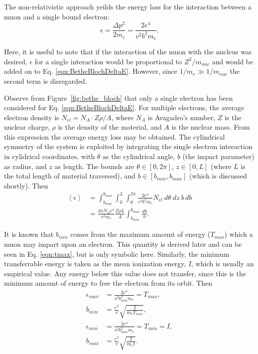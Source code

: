 The non-relativistic approach yeilds the energy loss for the interaction between a muon and a single bound electron:
\begin{equation}\label{eqn:BetheBlochDeltaE}
\epsilon=\frac{\Delta p^2}{2m_e}=\frac{2e^4}{v^2 b^2 m_e}.
\end{equation}

Here, it is useful to note that if the interaction of the muon with the nucleus was desired, $\epsilon$ for a single interaction would be proportional to $Z^2/m_{nuc}$ and would be added on to Eq. \eqref{eqn:BetheBlochDeltaE}. However, since $1/m_e \gg 1/m_{nuc}$ the second term is disregarded.

Observe from Figure~\ref{fig:bethe_bloch} that only a single electron has been considered for Eq. \eqref{eqn:BetheBlochDeltaE}. For multiple electrons, the average electron density is $N_{el}=N_A\cdot Z\rho/A$, where $N_A$ is Avagadro's number, $Z$ is the nuclear charge, $\rho$ is the density of the material, and $A$ is the nuclear mass. From this expression the average energy loss may be obtained. The cylindrical symmetry of the system is exploited by integrating the single electron interaction in cylidrical coordinates, with $\theta$ as the cylindrical angle, $b$ (the impact parameter) as radius, and $z$ as length. The bounds are $\theta \in [0,2\pi]$, $z\in[0,L]$ (where $L$ is the total length of material traversed), and $b\in[b_{min},b_{max}]$ (which is discussed shortly). Then
\begin{align}
\left<\epsilon\right>&=\int_{b_{min}} ^{b_{max}} \int_0 ^L \int_0 ^{2\pi}  \frac{2e^4}{v^2b^2m_e}N_{el}\: d\theta \: dz\: b \,db \nonumber\\
&=\frac{4\pi N_A e^4}{v^2 m_e}\frac{Z\rho L}{A}\int_{b_{min}} ^{b_{max}} \frac{db}{b}. \label{eqn:BetheBlochIntermediate}
\end{align}

It is known that $b_{min}$ comes from the maximum amount of energy ($T_{max}$) which a muon may impart upon an electron. This quantity is derived later and can be seen in Eq. \eqref{eqn:tmax}, but is only symbolic here. Similarly, the minimum transferrable energy is taken as the mean ionization energy, $I$, which is usually an empirical value. Any energy below this value does not transfer, since this is the minimum amount of energy to free the electron from its orbit. Then
\begin{align*}
\epsilon_{max}&=\frac{2e^4}{v^2b_{min} ^2 m_e}=T_{max},\\
b_{min}&=\frac{e^2}{v}\sqrt{\frac{2}{m_e T_{max}}},\\[12pt]
\epsilon_{min}&=\frac{2e^4}{v^2b_{max} ^2 m_e}=T_{min}=I,\\
b_{max}&=\frac{e^2}{v}\sqrt{\frac{2}{m_e I}}.
\end{align*}

